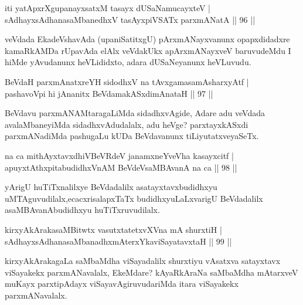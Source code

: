 \begin{shl}
iti yatApxrXgupanayxsatxM tasayx dUSaNamucayxteV  | \\
sAdhayxsAdhanasaMbanedhxV tasAyxpiVSATx parxmANatA \hfill||  96 ||  
\end{shl}

\begin{artha}
veVdada EkadeVshavAda (upaniSatitxgU) pArxmANayxvanunx opapxdidadxre kamaRkAMDa rUpavAda elAlx veVdakUkx apArxmANayxveV baruvudeMdu I hiMde yAvudanunx heVLididxto, adara dUSaNeyanunx heVLuvudu. 
\end{artha}


\begin{shl}
BeVdaH parxmAnatxreYH sidodhxV na tAvxgamasamAsharxyAtf  | \\
pashavoV\s pi hi jAnanitx BeVdamakASxdimAnataH \hfill||  97 || 
\end{shl}

\begin{artha}
BeVdavu parxmANAMtaragaLiMda sidadhxvAgide, Adare adu veVdada avalaMbaneyiMda sidadhxvAdudalalx, adu heVge? parxtayxkASxdi parxmANadiMda pashugaLu kUDa BeVdavanunx tiLiyutatxveyaSeTx.
\end{artha}


\begin{shl}
na ca mithAyxtavxdhiVBeVRdeV janamxneYveVha kasayxcitf  | \\
apuyxtAthxpitabudidhxVnAM BeVdeV\s saMBAvanA na ca \hfill||  98 ||  
\end{shl}

\begin{artha}
yArigU huTiTxnalilxye BeVdadalilx asatayxtavxbudidhxyu uMTAguvudilalx,\break ecacxrisalapxTaTx budidhxyuLaLxvarigU BeVdadalilx asaMBAvanAbudidhxyu huTiTxruvudilalx.
\end{artha}

\begin{shl}
kirxyAkArakasaMBitwtx vasutxtatetxvXVna mA shurxtiH  | \\
sAdhayxsAdhanasaMbanadhxmAterxYkaviSayatavxtaH \hfill||  99 ||  
\end{shl}

\begin{artha}
kirxyAkArakagaLa saMbaMdha viSayadalilx shurxtiyu vAsatxva satayxtavx viSayakekx parxmANavalalx, EkeMdare? kAyaRkAraNa saMbaMdha mAtarxveV muKayx parxtipAdayx viSayavAgiruvudariMda itara viSayakekx parxmANavalalx.
\end{artha}

